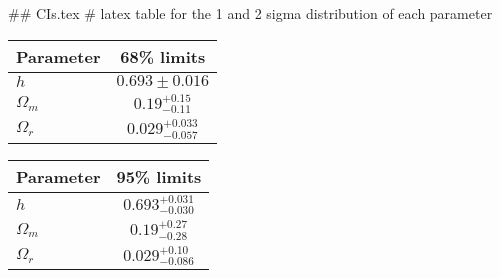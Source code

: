 ## CIs.tex
# latex table for the 1 and 2 sigma distribution of each parameter

\begin{tabular} { l  c}
 Parameter &  68\% limits\\
\hline
{\boldmath$h              $} & $0.693\pm 0.016            $\\
{\boldmath$\Omega_m       $} & $0.19^{+0.15}_{-0.11}      $\\
{\boldmath$\Omega_r       $} & $0.029^{+0.033}_{-0.057}   $\\
\hline
\end{tabular}

\begin{tabular} { l  c}
 Parameter &  95\% limits\\
\hline
{\boldmath$h              $} & $0.693^{+0.031}_{-0.030}   $\\
{\boldmath$\Omega_m       $} & $0.19^{+0.27}_{-0.28}      $\\
{\boldmath$\Omega_r       $} & $0.029^{+0.10}_{-0.086}    $\\
\hline
\end{tabular}
